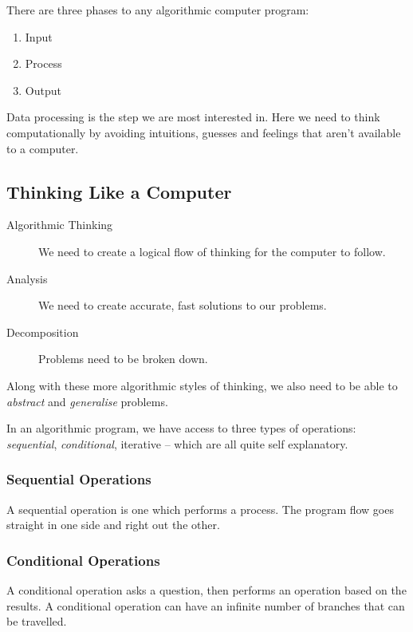There are three phases to any algorithmic computer program:
\begin{enumerate}
    \item Input
    \item Process
    \item Output
\end{enumerate}
Data processing is the step we are most interested in.
Here we need to think computationally by avoiding intuitions, guesses and feelings that aren't available to a computer.

\subsection{Thinking Like a Computer}\label{sub:thinking_like_a_computer}

\begin{description}
    \item[Algorithmic Thinking] We need to create a logical flow of thinking for the computer to follow.
    \item[Analysis] We need to create accurate, fast solutions to our problems.
    \item[Decomposition] Problems need to be broken down.
\end{description}
Along with these more algorithmic styles of thinking, we also need to be able to \emph{abstract} and \emph{generalise} problems.

In an algorithmic program, we have access to three types of operations: \emph{sequential}, \emph{conditional}, iterative -- which are all quite self explanatory.

\subsubsection{Sequential Operations}\label{ssub:sequential}

A sequential operation is one which performs a process.
The program flow goes straight in one side and right out the other.

\subsubsection{Conditional Operations}\label{ssub:conditional_operations}

A conditional operation asks a question, then performs an operation based on the results.
A conditional operation can have an infinite number of branches that can be travelled.

